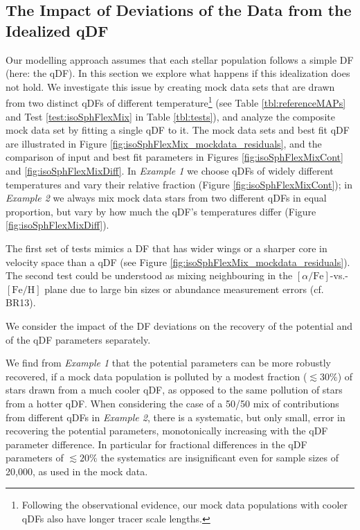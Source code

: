 \subsection{The Impact of Deviations of the Data from the Idealized qDF} \label{sec:results_mixedDFs}

Our modelling approach assumes that each stellar population follows a simple DF (here: the qDF). In this section we explore what happens if this idealization does not hold. We investigate this issue by creating mock data sets that are drawn from two distinct qDFs of different temperature\footnote{Following the observational evidence, our mock data populations with cooler qDFs also have longer tracer scale lengths.} (see Table \ref{tbl:referenceMAPs} and Test \ref{test:isoSphFlexMix} in Table \ref{tbl:tests}), and analyze the composite mock data set by fitting a single qDF to it. The mock data sets and best fit qDF are illustrated in Figure \ref{fig:isoSphFlexMix_mockdata_residuals}, and the comparison of input and best fit parameters in Figures \ref{fig:isoSphFlexMixCont} and \ref{fig:isoSphFlexMixDiff}. In \emph{Example 1} we choose qDFs of widely different temperatures and vary their relative fraction (Figure \ref{fig:isoSphFlexMixCont}); in \emph{Example 2} we always mix mock data stars from two different qDFs in equal proportion, but vary by how much the qDF's temperatures differ (Figure \ref{fig:isoSphFlexMixDiff}). 

The first set of tests mimics a DF that has wider wings or a sharper core in velocity space than a qDF (see Figure \ref{fig:isoSphFlexMix_mockdata_residuals}). The second test could be understood as mixing neighbouring \MAPs{} in the $[\alpha/\mathrm{Fe}]$-vs.-$[\mathrm{Fe}/\mathrm{H}]$ plane due to large bin sizes or abundance measurement errors (cf. BR13). 

We consider the impact of the DF deviations on the recovery of the potential and of the qDF parameters separately. 

We find from \emph{Example 1} that the potential parameters can be more robustly recovered, if a mock data population is polluted by a modest fraction ($\lesssim 30\%$) of stars drawn from a much cooler qDF, as opposed to the same pollution of stars from a hotter qDF. When considering the case of a 50/50 mix of contributions from different qDFs in \emph{Example 2}, there is a systematic, but only small, error in recovering the potential parameters, monotonically increasing with the qDF parameter difference. In particular for fractional differences in the qDF parameters of $\lesssim 20\%$ the systematics are insignificant even for sample sizes of 20,000, as used in the mock data.

